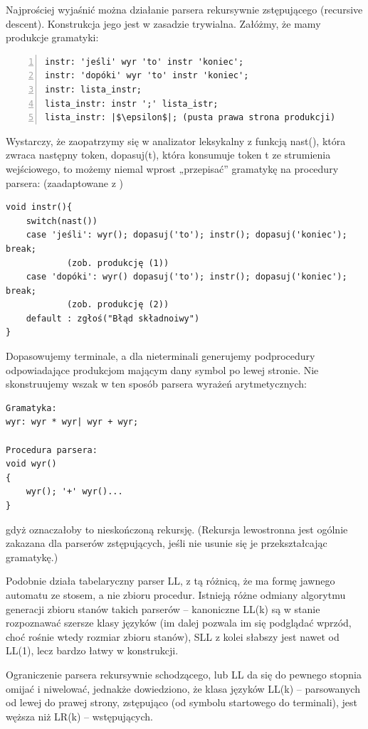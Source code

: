 Najprościej wyjaśnić można działanie parsera rekursywnie zstępującego (recursive descent). Konstrukcja jego jest w zasadzie trywialna. Załóżmy, że mamy produkcje gramatyki:

\begin{lstlisting}[numbers=left]
instr: 'jeśli' wyr 'to' instr 'koniec';
instr: 'dopóki' wyr 'to' instr 'koniec';
instr: lista_instr;
lista_instr: instr ';' lista_istr;
lista_instr: |$\epsilon$|; (pusta prawa strona produkcji)
\end{lstlisting}

Wystarczy, że zaopatrzymy się w analizator leksykalny z funkcją nast(), która zwraca następny token, dopasuj(t), która konsumuje token t ze strumienia wejściowego, to możemy niemal wprost „przepisać” gramatykę na procedury parsera: (zaadaptowane z \cite[str.~70]{DRAGON_BOOK})

\begin{lstlisting}
void instr(){
	switch(nast())
	case 'jeśli': wyr(); dopasuj('to'); instr(); dopasuj('koniec'); break; 
            (zob. produkcję (1))
	case 'dopóki': wyr() dopasuj('to'); instr(); dopasuj('koniec'); break;
            (zob. produkcję (2))
	default : zgłoś("Błąd składnoiwy")
}
\end{lstlisting}
Dopasowujemy terminale, a dla nieterminali generujemy podprocedury odpowiadające produkcjom mającym dany symbol po lewej stronie.
Nie skonstruujemy wszak w ten sposób parsera wyrażeń arytmetycznych:
\lstset{escapechar=@,}
\begin{lstlisting}
Gramatyka: 
wyr: wyr * wyr| wyr + wyr;

Procedura parsera: 
void wyr()
{
    wyr(); '+' wyr()...
}
\end{lstlisting}
\lstset{escapechar=|,}
gdyż oznaczałoby to nieskończoną rekursję. (Rekursja lewostronna jest ogólnie zakazana dla parserów zstępujących, jeśli nie usunie się je przekształcając gramatykę.)

Podobnie działa tabelaryczny parser LL, z tą różnicą, że ma formę jawnego automatu ze stosem, a nie zbioru procedur. Istnieją różne odmiany algorytmu generacji zbioru stanów takich parserów – kanoniczne LL(k) są w stanie rozpoznawać szersze klasy języków (im dalej pozwala im się podglądać wprzód, choć rośnie wtedy rozmiar zbioru stanów), SLL z kolei słabszy jest nawet od LL(1), lecz bardzo łatwy w konstrukcji.\cite{DRAGON_BOOK}

Ograniczenie parsera rekursywnie schodzącego, lub LL da się do pewnego stopnia omijać i niwelować, jednakże dowiedziono\cite{Nijholt}, że klasa języków LL(k) – parsowanych od lewej do prawej strony, zstępująco (od symbolu startowego do terminali), jest węższa niż LR(k) – wstępujących.

